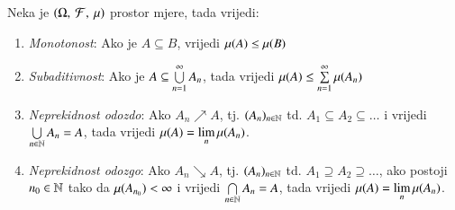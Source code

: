 \begin{tm} \label{tm:1.24-1}
    Neka je $(\Omega, \: \mathcal{F}, \: \mu)$ prostor mjere, tada vrijedi:
    \begin{enumerate}[label={(\roman*)}]
        \item \label{tm:1.24-1.1}
        \emph{Monotonost}: Ako je $A \subseteq B$, vrijedi 
            $\mu({A}) \leq \mu({B})$
        \item \emph{Subaditivnost}: Ako je $A \subseteq \bigcup\limits_{n=1}^{\infty} A_n$, tada
            vrijedi $\mu({A}) \leq \sum\limits_{n=1}^{\infty} \mu({A_n})$
        \item \label{tm:1.24-1.3}
        \emph{Neprekidnost odozdo}: Ako $A_n \nearrow A$, 
            tj. $(A_n)_{n \in \mathbb{N}}$ td. $A_1 \subseteq A_2 \subseteq \dots$ i vrijedi
            $\bigcup\limits_{n \in \mathbb{N}}^{} A_n = A$, tada vrijedi $\mu({A}) =
            \lim\limits_{n} \mu({A_n})$.
        \item \emph{Neprekidnost odozgo}: Ako $A_n \searrow A$, tj. $(A_n)_{n \in \mathbb{N}}$ td.
            $A_1 \supseteq A_2 \supseteq \dots$, ako postoji $n_0 \in \mathbb{N}$ tako da
            $\mu({A_{n_0}}) < \infty$ i vrijedi $\bigcap\limits_{n \in \mathbb{N}}^{} A_n = A$,
            tada vrijedi $\mu({A}) = \lim\limits_{n} \mu({A_n})$.
    \end{enumerate}
\end{tm}

